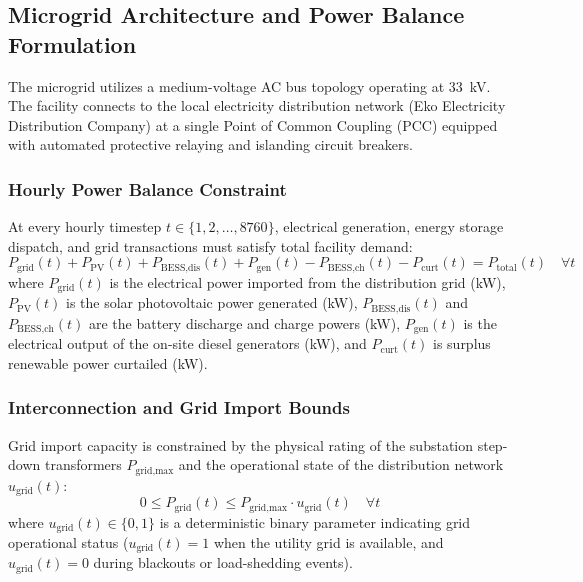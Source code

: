 \documentclass[11pt,a4paper]{article}
\begin{document}
\subsection{Microgrid Architecture and Power Balance Formulation}
\label{sec:microgrid_topology}

The microgrid utilizes a medium-voltage AC bus topology operating at 33~kV. The facility connects to the local electricity distribution network (Eko Electricity Distribution Company) at a single Point of Common Coupling (PCC) equipped with automated protective relaying and islanding circuit breakers.

\subsubsection{Hourly Power Balance Constraint}
At every hourly timestep $t \in \{1, 2, \dots, 8760\}$, electrical generation, energy storage dispatch, and grid transactions must satisfy total facility demand:
\begin{equation}
    P_{\text{grid}}(t) + P_{\text{PV}}(t) + P_{\text{BESS,dis}}(t) + P_{\text{gen}}(t) - P_{\text{BESS,ch}}(t) - P_{\text{curt}}(t) = P_{\text{total}}(t) \quad \forall t
    \label{eq:balance}
\end{equation}
where $P_{\text{grid}}(t)$ is the electrical power imported from the distribution grid (kW), $P_{\text{PV}}(t)$ is the solar photovoltaic power generated (kW), $P_{\text{BESS,dis}}(t)$ and $P_{\text{BESS,ch}}(t)$ are the battery discharge and charge powers (kW), $P_{\text{gen}}(t)$ is the electrical output of the on-site diesel generators (kW), and $P_{\text{curt}}(t)$ is surplus renewable power curtailed (kW).

\subsubsection{Interconnection and Grid Import Bounds}
Grid import capacity is constrained by the physical rating of the substation step-down transformers $P_{\text{grid,max}}$ and the operational state of the distribution network $u_{\text{grid}}(t)$:
\begin{equation}
    0 \le P_{\text{grid}}(t) \le P_{\text{grid,max}} \cdot u_{\text{grid}}(t) \quad \forall t
    \label{eq:grid_bound}
\end{equation}
where $u_{\text{grid}}(t) \in \{0, 1\}$ is a deterministic binary parameter indicating grid operational status ($u_{\text{grid}}(t) = 1$ when the utility grid is available, and $u_{\text{grid}}(t) = 0$ during blackouts or load-shedding events).
\end{document}
